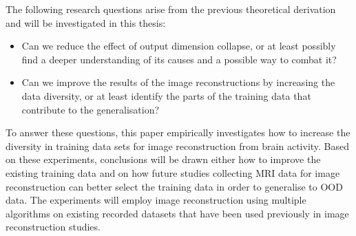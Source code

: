 The following research questions arise from the previous theoretical derivation and will be investigated in this thesis:
\begin{itemize}
    \item Can we reduce the effect of output dimension collapse, or at least possibly find a deeper understanding of its causes and a possible way to combat it?
    \item Can we improve the results of the image reconstructions by increasing the data diversity, or at least identify the parts of the training data that contribute to the generalisation?
\end{itemize}
To answer these questions, this paper empirically investigates how to increase the diversity in training data sets for image reconstruction from brain activity. Based on these experiments, conclusions will be drawn either how to improve the existing training data and on how future studies collecting MRI data for image reconstruction can better select the training data in order to generalise to OOD data. The experiments will employ image reconstruction using multiple algorithms on existing recorded datasets that have been used previously in image reconstruction studies.

